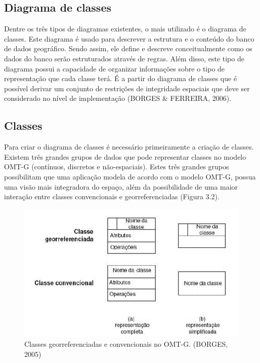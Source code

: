 	   \subsection{Diagrama de classes}
	   
		Dentre os três tipos de diagramas existentes, o mais utilizado é o diagrama de classes. Este diagrama é usado para descrever a estrutura e o conteúdo do banco de dados geográfico. Sendo assim, ele define e descreve conceitualmente como os dados do banco serão estruturados através de regras. Além disso, este tipo de diagrama possui a capacidade de organizar informações sobre o tipo de representação que cada classe terá. É a partir do diagrama de classes que é possível derivar um conjunto de restrições de integridade espaciais que deve ser considerado no nível de implementação (BORGES \& FERREIRA, 2006).
	
		\subsection{Classes}
		
		Para criar o diagrama de classes é necessário primeiramente a criação de classes. Existem três grandes grupos de dados que pode representar classes no modelo OMT-G (contínuos, discretos e não-espaciais). Estes três grandes grupos possibilitam que uma aplicação modela de acordo com o modelo OMT-G, possua uma visão mais integradora do espaço, além da possibilidade de uma maior interação entre classes convencionais e georreferenciadas (Figura 3.2).
		
		\begin{figure} [h]
			\centering
			\includegraphics[width=1\linewidth]{data/omtg_classes}
			\caption{Classes georreferenciadas e convencionais no OMT-G. (BORGES, 2005)}
			\label{fig:omtgclasses}
		\end{figure}
	
